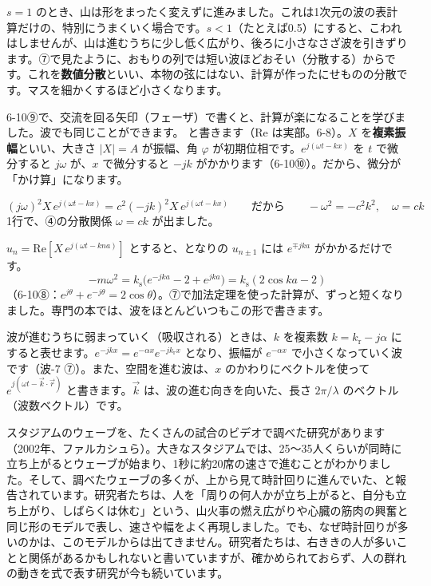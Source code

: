 \begin{seikaku}
$s=1$ のとき、山は形をまったく変えずに進みました。これは1次元の波の表計算だけの、特別にうまくいく場合です。$s<1$（たとえば0.5）にすると、こわれはしませんが、山は進むうちに少し低く広がり、後ろに小さなさざ波を引きずります。⑦で見たように、おもりの列では短い波ほどおそい（分散する）からです。これを\textbf{数値分散}といい、本物の弦にはない、計算が作ったにせものの分散です。マスを細かくするほど小さくなります。
\end{seikaku}

\label{ph:波-5:sec9}
6-10⑨で、交流を回る矢印（フェーザ）で書くと、計算が楽になることを学びました。波でも同じことができます。
と書きます（Re は実部。6-8）。$X$ を\textbf{複素振幅}といい、大きさ $|X|=A$ が振幅、角 $\varphi$ が初期位相です。$e^{j(\omega t-kx)}$ を $t$ で微分すると $j\omega$ が、$x$ で微分すると $-jk$ がかかります（6-10⑩）。だから、微分が「かけ算」になります。

\[(j\omega)^2X\,e^{j(\omega t-kx)}=c^2(-jk)^2X\,e^{j(\omega t-kx)}\qquad\text{だから}\qquad-\omega^2=-c^2k^2,\quad\omega=ck\]
1行で、④の分散関係 $\omega=ck$ が出ました。

$u_n=\mathrm{Re}[X\,e^{j(\omega t-kna)}]$ とすると、となりの $u_{n\pm1}$ には $e^{\mp jka}$ がかかるだけです。
\[-m\omega^2=k_{\mathrm s}\bigl(e^{-jka}-2+e^{jka}\bigr)=k_{\mathrm s}(2\cos ka-2)\]
（6-10⑧：$e^{j\theta}+e^{-j\theta}=2\cos\theta$）。⑦で加法定理を使った計算が、ずっと短くなりました。専門の本では、波をほとんどいつもこの形で書きます。

\begin{seikaku}
波が進むうちに弱まっていく（吸収される）ときは、$k$ を複素数 $k=k_{\mathrm r}-j\alpha$ にすると表せます。$e^{-jkx}=e^{-\alpha x}e^{-jk_{\mathrm r}x}$ となり、振幅が $e^{-\alpha x}$ で小さくなっていく波です（波-7 ⑦）。また、空間を進む波は、$x$ のかわりにベクトルを使って $e^{j(\omega t-\vec k\cdot\vec r)}$ と書きます。$\vec k$ は、波の進む向きを向いた、長さ $2\pi/\lambda$ のベクトル（波数ベクトル）です。
\end{seikaku}

\begin{phmada}
スタジアムのウェーブを、たくさんの試合のビデオで調べた研究があります（2002年、ファルカシュら）。大きなスタジアムでは、25〜35人くらいが同時に立ち上がるとウェーブが始まり、1秒に約20席の速さで進むことがわかりました。そして、調べたウェーブの多くが、上から見て時計回りに進んでいた、と報告されています。研究者たちは、人を「周りの何人かが立ち上がると、自分も立ち上がり、しばらくは休む」という、山火事の燃え広がりや心臓の筋肉の興奮と同じ形のモデルで表し、速さや幅をよく再現しました。でも、なぜ時計回りが多いのかは、このモデルからは出てきません。研究者たちは、右ききの人が多いことと関係があるかもしれないと書いていますが、確かめられておらず、人の群れの動きを式で表す研究が今も続いています。
\end{phmada}

